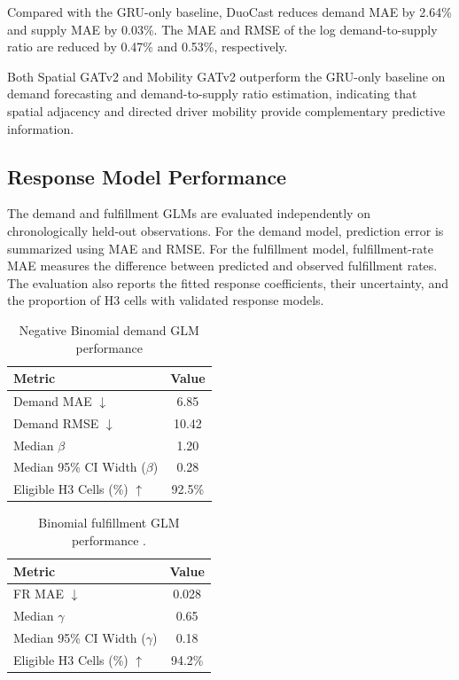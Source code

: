 \documentclass[a4paper,10pt,twocolumn]{article}
\begin{document}
Compared with the GRU-only baseline, DuoCast reduces demand MAE by 2.64\%
and supply MAE by 0.03\%. The MAE and RMSE of the log demand-to-supply ratio
are reduced by 0.47\% and 0.53\%, respectively.

Both Spatial GATv2 and Mobility GATv2 outperform the
GRU-only baseline on demand forecasting and demand-to-supply ratio
estimation, indicating that spatial adjacency and directed driver mobility
provide complementary predictive information.

\subsection{Response Model Performance}
The demand and fulfillment GLMs are evaluated independently on
chronologically held-out observations. For the demand model, prediction error
is summarized using MAE and RMSE. For the fulfillment model, fulfillment-rate
MAE measures the difference between predicted and observed fulfillment rates.
The evaluation also reports the fitted response coefficients, their uncertainty,
and the proportion of H3 cells with validated response models.

\begin{table}[H]
\centering
\caption{Negative Binomial demand GLM performance}
\label{tab:demand-glm-performance}
\footnotesize
\begin{tabularx}{\columnwidth}{@{}Xc@{}}
\toprule
\textbf{Metric} & \textbf{Value} \\
\midrule
Demand MAE $\downarrow$                 & 6.85 \\
Demand RMSE $\downarrow$                & 10.42 \\
Median $\beta$                          & 1.20 \\
Median 95\% CI Width ($\beta$)          & 0.28 \\
Eligible H3 Cells (\%) $\uparrow$      & 92.5\% \\
\bottomrule
\end{tabularx}
\end{table}

\begin{table}[H]
\centering
\caption{Binomial fulfillment GLM performance
.}
\label{tab:fulfillment-glm-performance}
\footnotesize
\begin{tabularx}{\columnwidth}{@{}Xc@{}}
\toprule
\textbf{Metric} & \textbf{Value} \\
\midrule
FR MAE $\downarrow$                     & 0.028 \\
Median $\gamma$                         & 0.65 \\
Median 95\% CI Width ($\gamma$)         & 0.18 \\
Eligible H3 Cells (\%) $\uparrow$      & 94.2\% \\
\bottomrule
\end{tabularx}
\end{table}
\end{document}
